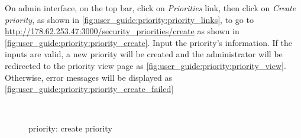 On admin interface, on the top bar, click on \emph{Priorities} link, then click on \emph{Create priority}, as shown in \autoref{fig:user_guide:priority:priority_links}, 
to go to \href{http://178.62.253.47:3000/security\_priorities/create}{http://178.62.253.47:3000/security\_priorities/create} as shown in \autoref{fig:user_guide:priority:priority_create}.
Input the priority's information.
If the inputs are valid, a new priority will be created and the administrator will be redirected to the priority view page as \autoref{fig:user_guide:priority:priority_view}.
Otherwise, error messages will be displayed as \autoref{fig:user_guide:priority:priority_create_failed}

\begin{figure}[bth]
\myfloatalign
{} \quad
{} \\
\caption[Priority: create priority]{priority: create priority}
\label{fig:user_guide:priority:priority_create}
\end{figure}

